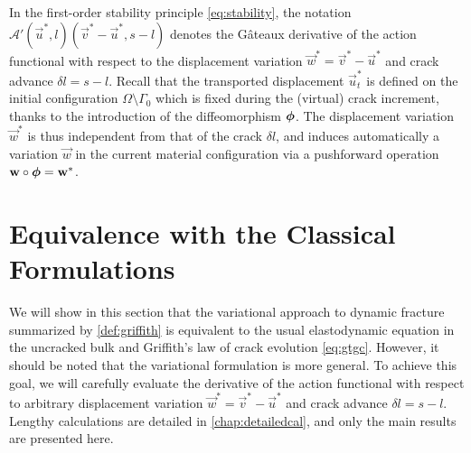 In the first-order stability principle \eqref{eq:stability}, the notation $\mathcal{A}'(\vec{u}^*,l)(\vec{v}^*-\vec{u}^*,s-l)$ denotes the Gâteaux derivative of the action functional with respect to the displacement variation $\vec{w}^*=\vec{v}^*-\vec{u}^*$ and crack advance $\delta l=s-l$. Recall that the transported displacement $\vec{u}_t^*$ is defined on the initial configuration $\Omega\setminus\Gamma_0$ which is fixed during the (virtual) crack increment, thanks to the introduction of the diffeomorphism $\philt$. The displacement variation $\vec{w}^*$ is thus independent from that of the crack $\delta l$, and induces automatically a variation $\vec{w}$ in the current material configuration via a pushforward operation $\vec{w}\circ\philt=\vec{w}^*$.

\section*{Equivalence with the Classical Formulations}
We will show in this section that the variational approach to dynamic fracture summarized by \cref{def:griffith} is equivalent to the usual elastodynamic equation in the uncracked bulk and Griffith's law of crack evolution \eqref{eq:gtgc}. However, it should be noted that the variational formulation is more general. To achieve this goal, we will carefully evaluate the derivative of the action functional with respect to arbitrary displacement variation $\vec{w}^*=\vec{v}^*-\vec{u}^*$ and crack advance $\delta l=s-l$. Lengthy calculations are detailed in \cref{chap:detailedcal}, and only the main results are presented here.

